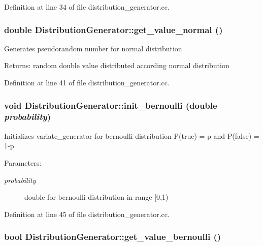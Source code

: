 Definition at line 34 of file distribution\_\-generator.cc.\hypertarget{class_distribution_generator_cee20f8384e79b351040f9d864750569}{
\subsubsection[get\_\-value\_\-normal]{\setlength{\rightskip}{0pt plus 5cm}double DistributionGenerator::get\_\-value\_\-normal ()}}
\label{class_distribution_generator_cee20f8384e79b351040f9d864750569}


Generates pseudorandom number for normal distribution \begin{Desc}
\item[Returns:]random double value distributed according normal distribution \end{Desc}


Definition at line 41 of file distribution\_\-generator.cc.\hypertarget{class_distribution_generator_00f450f4a649e3a5c53d9cdebf160e67}{
\subsubsection[init\_\-bernoulli]{\setlength{\rightskip}{0pt plus 5cm}void DistributionGenerator::init\_\-bernoulli (double {\em probability})}}
\label{class_distribution_generator_00f450f4a649e3a5c53d9cdebf160e67}


Initializes variate\_\-generator for bernoulli distribution P(true) = p and P(false) = 1-p \begin{Desc}
\item[Parameters:]
\begin{description}
\item[{\em probability}]double for bernoulli distribution in range \mbox{[}0,1) \end{description}
\end{Desc}


Definition at line 45 of file distribution\_\-generator.cc.\hypertarget{class_distribution_generator_f9be2ca79fea37085900802673d9c16a}{
\subsubsection[get\_\-value\_\-bernoulli]{\setlength{\rightskip}{0pt plus 5cm}bool DistributionGenerator::get\_\-value\_\-bernoulli ()}}
\label{class_distribution_generator_f9be2ca79fea37085900802673d9c16a}


